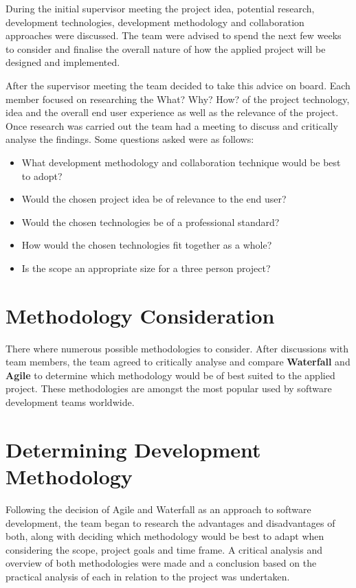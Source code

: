 During the initial supervisor meeting the project idea, potential research, development technologies, development methodology and collaboration approaches were discussed. The team were advised to spend the next few weeks to consider and finalise the overall nature of how the applied project will be designed and implemented.

\vspace{5mm} %

After the supervisor meeting the team decided to take this advice on board. Each member focused on researching the What? Why? How? of the project technology, idea and the overall end user experience as well as the relevance of the project. Once research was carried out the team had a meeting to discuss and critically analyse the findings. Some questions asked were as follows:

\begin{itemize}

    \item {What development methodology and collaboration technique would be best to adopt?}

    \item{Would the chosen project idea be of relevance to the end user?}

     \item{Would the chosen technologies be of a professional standard?}

    \item{How would the chosen technologies fit together as a whole?}

    \item{Is the scope an appropriate size for a three person project?}

\end{itemize}

\section{Methodology Consideration}
There where numerous possible methodologies to consider. After discussions with team members, the team agreed to critically analyse and compare \textbf{Waterfall} and \textbf{Agile} to determine which methodology would be of best suited to the applied project. These methodologies are amongst the most popular used by software development teams worldwide.
\vspace{5mm} %


\section{Determining Development Methodology}
Following the decision of Agile and Waterfall as an approach to software development, the team began to research the advantages and disadvantages of both, along with deciding which methodology would be best to adapt when considering the scope, project goals and time frame. A critical analysis and overview of both methodologies were made and a conclusion based on the practical analysis of each in relation to the project was undertaken.

